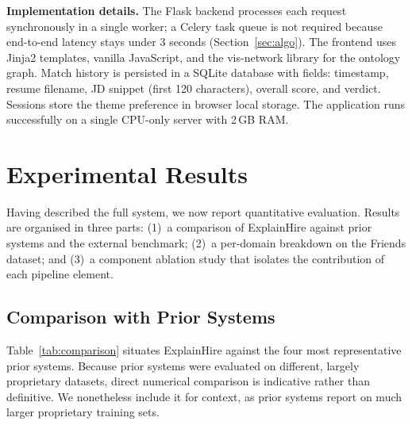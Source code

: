 \documentclass[conference]{IEEEtran}
\begin{document}
\noindent\textbf{Implementation details.} The Flask backend processes each
request synchronously in a single worker; a Celery task queue is not required
because end-to-end latency stays under 3 seconds (Section~\ref{sec:algo}).
The frontend uses Jinja2 templates, vanilla JavaScript, and the vis-network
library for the ontology graph. Match history is persisted in a SQLite
database with fields: timestamp, resume filename, JD snippet (first 120
characters), overall score, and verdict. Sessions store the theme preference
in browser local storage. The application runs successfully on a single
CPU-only server with 2\,GB RAM.

\section{Experimental Results}
\label{sec:results}

Having described the full system, we now report quantitative evaluation.
Results are organised in three parts: (1)~a comparison of ExplainHire
against prior systems and the external benchmark; (2)~a per-domain breakdown
on the Friends dataset; and (3)~a component ablation study that isolates
the contribution of each pipeline element.

\subsection{Comparison with Prior Systems}

Table~\ref{tab:comparison} situates ExplainHire against the four most
representative prior systems. Because prior systems were evaluated on
different, largely proprietary datasets, direct numerical comparison is
indicative rather than definitive. We nonetheless include it for context,
as prior systems report on much larger proprietary training sets.
\end{document}
